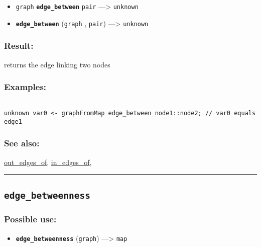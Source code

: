 \documentclass[]{book}
\providecommand{\tightlist}{%
  \setlength{\itemsep}{0pt}\setlength{\parskip}{0pt}}
\theoremstyle{definition}
\theoremstyle{definition}
\theoremstyle{definition}
\theoremstyle{remark}
\begin{document}
\begin{itemize}
\tightlist
\item
  \texttt{graph} \textbf{\texttt{edge\_between}} \texttt{pair}
  ---\textgreater{} \texttt{unknown}
\item
  \textbf{\texttt{edge\_between}} (\texttt{graph} , \texttt{pair})
  ---\textgreater{} \texttt{unknown}
\end{itemize}

\subsubsection{Result:}\label{result-140}

returns the edge linking two nodes

\subsubsection{Examples:}\label{examples-109}

\begin{verbatim}
 
unknown var0 <- graphFromMap edge_between node1::node2; // var0 equals edge1
\end{verbatim}

\subsubsection{See also:}\label{see-also-85}

\href{OperatorsNR\#out_edges_of}{out\_edges\_of},
\href{OperatorsIM\#in_edges_of}{in\_edges\_of},

\begin{center}\rule{0.5\linewidth}{\linethickness}\end{center}

\subsection{\texorpdfstring{\texttt{edge\_betweenness}}{edge\_betweenness}}\label{edge_betweenness}

\subsubsection{Possible use:}\label{possible-use-146}

\begin{itemize}
\tightlist
\item
  \textbf{\texttt{edge\_betweenness}} (\texttt{graph}) ---\textgreater{}
  \texttt{map}
\end{itemize}
\end{document}
